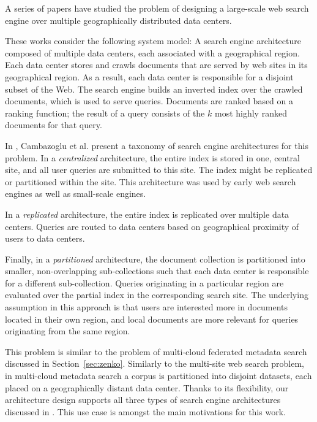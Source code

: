 A series of papers \cite{cambazoglu:multisitequantifying, yates:multisitefeasibility, cambazoglu:multisiteforwarding, frances:multisiteefficiency, kayaaslan:multisitereplication}
have studied the problem of designing a large-scale web search engine over multiple geographically distributed data centers.

These works consider the following system model:
A search engine architecture composed of multiple data centers, each associated with a geographical region.
Each data center stores and crawls documents that are served by web sites in its geographical region.
As a result, each data center is responsible for a disjoint subset of the Web.
The search engine builds an inverted index over the crawled documents, which is used to serve queries.
Documents are ranked based on a ranking function; the result of a query consists of the $k$ most highly ranked documents
for that query.

\bigskip
\noindent
In \cite{cambazoglu:multisitequantifying}, Cambazoglu et al. present a taxonomy of search engine architectures for this problem.
In a \textit{centralized} architecture, the entire index is stored in one, central site, and all user queries are submitted to this site.
The index might be replicated or partitioned within the site.
This architecture was used by early web search engines as well as small-scale engines.

In a \textit{replicated} architecture, the entire index is replicated over multiple data centers.
Queries are routed to data centers based on geographical proximity of users to data centers.

Finally, in a \textit{partitioned} architecture, the document collection is partitioned into smaller, non-overlapping
sub-collections such that each data center is responsible for a different sub-collection.
Queries originating in a particular region are evaluated over the partial index in the corresponding search site.
The underlying assumption in this approach is that users are interested more in documents located in their own region,
and local documents are more relevant for queries originating from the same region.

This problem is similar to the problem of multi-cloud federated metadata search discussed in Section~\ref{sec:zenko}.
Similarly to the multi-site web search problem,
in multi-cloud metadata search a corpus is partitioned into disjoint datasets, each placed on a geographically distant
data center.
Thanks to its flexibility, our architecture design supports all three types of search engine architectures discussed in
\cite{cambazoglu:multisitequantifying}.
This use case is amongst the main motivations for this work.

